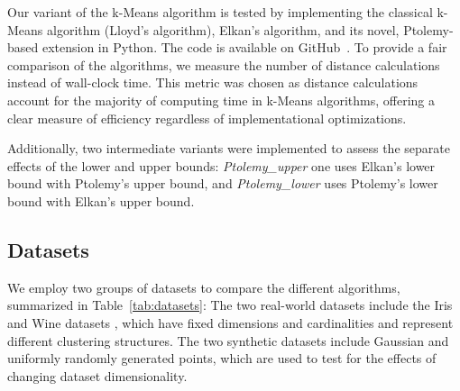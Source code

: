 Our variant of the k-Means algorithm is tested by implementing the classical k-Means algorithm (Lloyd's algorithm), Elkan's algorithm, and its novel, Ptolemy-based extension in Python.
The code is available on GitHub~\cite{Averitchev2024kMeansPtolemy}.
To provide a fair comparison of the algorithms,
we measure the number of distance calculations instead of wall-clock time.
This metric was chosen as distance calculations account for the majority of computing time in k-Means algorithms, offering a clear measure of efficiency regardless of implementational optimizations.

Additionally, two intermediate variants were implemented to assess the separate effects of the lower and upper bounds:
\emph{Ptolemy\_upper} one uses Elkan's lower bound with Ptolemy's upper bound, and \emph{Ptolemy\_lower} uses Ptolemy's lower bound with Elkan's upper bound.


\subsection{Datasets}
We employ two groups of datasets to compare the different algorithms, summarized in Table~\ref{tab:datasets}:
The two real-world datasets include the Iris and Wine datasets \cite{pedregosa2011scikit}, which have fixed dimensions and cardinalities and represent different clustering structures.
The two synthetic datasets include Gaussian and uniformly randomly generated points, which are used to test for the effects of changing dataset dimensionality.

